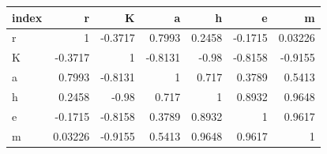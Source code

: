 \begin{tabular}{lrrrrrr}
\toprule
index & r & K & a & h & e & m \\
\midrule
r & 1 & -0.3717 & 0.7993 & 0.2458 & -0.1715 & 0.03226 \\
K & -0.3717 & 1 & -0.8131 & -0.98 & -0.8158 & -0.9155 \\
a & 0.7993 & -0.8131 & 1 & 0.717 & 0.3789 & 0.5413 \\
h & 0.2458 & -0.98 & 0.717 & 1 & 0.8932 & 0.9648 \\
e & -0.1715 & -0.8158 & 0.3789 & 0.8932 & 1 & 0.9617 \\
m & 0.03226 & -0.9155 & 0.5413 & 0.9648 & 0.9617 & 1 \\
\bottomrule
\end{tabular}
